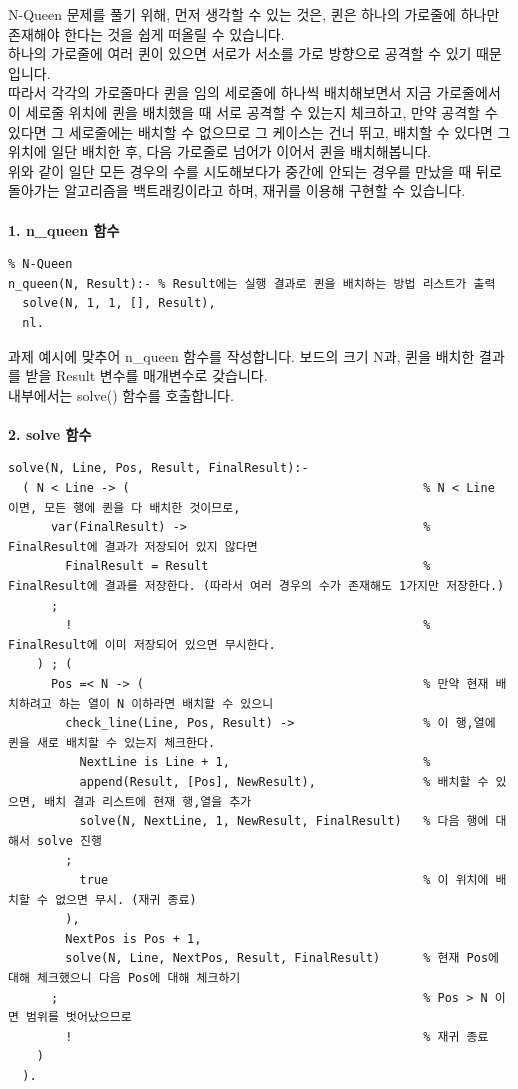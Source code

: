 \documentclass{article}
\begin{document}
\quad N-Queen 문제를 풀기 위해, 먼저 생각할 수 있는 것은, 퀸은 하나의 가로줄에 하나만 존재해야 한다는 것을 쉽게 떠올릴 수 있습니다.\\
하나의 가로줄에 여러 퀸이 있으면 서로가 서소를 가로 방향으로 공격할 수 있기 때문입니다.\\
따라서 각각의 가로줄마다 퀸을 임의 세로줄에 하나씩 배치해보면서 지금 가로줄에서 이 세로줄 위치에 퀸을 배치했을 때 서로 공격할 수 있는지 체크하고, 만약 공격할 수 있다면 그 세로줄에는 배치할 수 없으므로 그 케이스는 건너 뛰고, 배치할 수 있다면 그 위치에 일단 배치한 후, 다음 가로줄로 넘어가 이어서 퀸을 배치해봅니다.\\
위와 같이 일단 모든 경우의 수를 시도해보다가 중간에 안되는 경우를 만났을 때 뒤로 돌아가는 알고리즘을 백트래킹이라고 하며, 재귀를 이용해 구현할 수 있습니다.\\\\
\textbf{1. n\_queen 함수}
\begin{verbatim}
% N-Queen
n_queen(N, Result):- % Result에는 실행 결과로 퀸을 배치하는 방법 리스트가 출력
  solve(N, 1, 1, [], Result),
  nl.
\end{verbatim}
과제 예시에 맞추어 n\_queen 함수를 작성합니다. 보드의 크기 N과, 퀸을 배치한 결과를 받을 Result 변수를 매개변수로 갖습니다.\\
내부에서는 solve() 함수를 호출합니다.\\\\
\textbf{2. solve 함수}
\begin{verbatim}
solve(N, Line, Pos, Result, FinalResult):-
  ( N < Line -> (                                         % N < Line 이면, 모든 행에 퀸을 다 배치한 것이므로,
      var(FinalResult) ->                                 % FinalResult에 결과가 저장되어 있지 않다면 
        FinalResult = Result                              % FinalResult에 결과를 저장한다. (따라서 여러 경우의 수가 존재해도 1가지만 저장한다.)
      ;
        !                                                 % FinalResult에 이미 저장되어 있으면 무시한다.
    ) ; (
      Pos =< N -> (                                       % 만약 현재 배치하려고 하는 열이 N 이하라면 배치할 수 있으니
        check_line(Line, Pos, Result) ->                  % 이 행,열에 퀸을 새로 배치할 수 있는지 체크한다.
          NextLine is Line + 1,                           % 
          append(Result, [Pos], NewResult),               % 배치할 수 있으면, 배치 결과 리스트에 현재 행,열을 추가      
          solve(N, NextLine, 1, NewResult, FinalResult)   % 다음 행에 대해서 solve 진행
        ;
          true                                            % 이 위치에 배치할 수 없으면 무시. (재귀 종료)
        ),
        NextPos is Pos + 1,
        solve(N, Line, NextPos, Result, FinalResult)      % 현재 Pos에 대해 체크했으니 다음 Pos에 대해 체크하기
      ;                                                   % Pos > N 이면 범위를 벗어났으므로
        !                                                 % 재귀 종료
    )
  ).
\end{verbatim}
\end{document}
